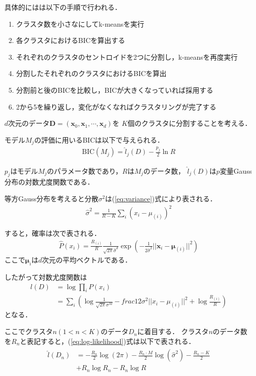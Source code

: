\documentclass[10pt,a4j,twocolumn]{ltjsarticle}
\def\eqref#1{(\ref{#1})式}
\begin{document}
具体的にはは以下の手順で行われる．
\begin{enumerate}
  \item クラスタ数を小さなにしてk-meansを実行
  \item 各クラスタにおけるBICを算出する
  \item それぞれのクラスタのセントロイドを2つに分割し，k-meansを再度実行
  \item 分割したそれぞれのクラスタにおけるBICを算出
  \item 分割前と後のBICを比較し，BICが大きくなっていれば採用する
  \item 2から5を繰り返し，変化がなくなればクラスタリングが完了する
\end{enumerate}

$d$次元のデータ${\bm D}=({\bm x_0}, {\bm x_1}, \cdots, {\bm x_d})$を
$K$個のクラスタに分割することを考える．

モデル$M_j$の評価に用いるBICは以下で与えられる．
\begin{align}
  \label{eq:bic}
  \mathrm{BIC}(M_j) = \hat{l}_j(D) - \frac{p_j}{2}\ln R
\end{align}

$p_j$はモデル$M_j$のパラメータ数であり，$R$は$M_j$のデータ数，
$\hat{l}_j(D)$は$p$変量Gauss分布の対数尤度関数である．

等方Gauss分布を考えると分散$\sigma^2$は\eqref{eq:variance}により表される．
\begin{align}
  \label{eq:variance}
  \hat{\sigma}^2 = \frac{1}{R-K}\sum_i\left(x_i - \mu_{(i)}\right)^2
\end{align}

すると，確率は次で表される．
\begin{align}
  \label{eq:gaussian-distribution}
  \hat{P}(x_i) = \frac{R_{(i)}}{R}\frac{1}{\sqrt{2\pi}\hat{\sigma}^d}
    \exp\left(-\frac{1}{2\hat{\sigma}^2}||{\bm x}_i-{\bm \mu}_{(i)}||^2\right)
\end{align}
ここで${\bm \mu}_{i}$は$d$次元の平均ベクトルである．

したがって対数尤度関数は
\begin{align}
  \label{eq:log-likelihood}
  l(D) &= \log \prod_i P(x_i) \\
  &= \sum_i \left( \log\frac{1}{\sqrt{2\pi}\sigma^M}-frac{1}{2\sigma^2}||x_i - \mu_{(i)}||^2 + \log\frac{R_{(i)}}{R} \right)
\end{align}
となる．

ここでクラスタ$n (1 < n < K)$のデータ$D_n$に着目する．
クラスタ$n$のデータ数を$R_n$と表記すると，\eqref{eq:log-likelihood}は以下で表される．
\begin{align}
  \begin{split}
    \hat{l}(D_n) &= -\frac{R_n}{2}\log(2\pi) - \frac{R_n \cdot M}{2}\log(\hat{\sigma}^2) -
    \frac{R_n - K}{2}\\ &
    + R_n\log R_n - R_n \log R
  \end{split}
\end{align}
\end{document}
